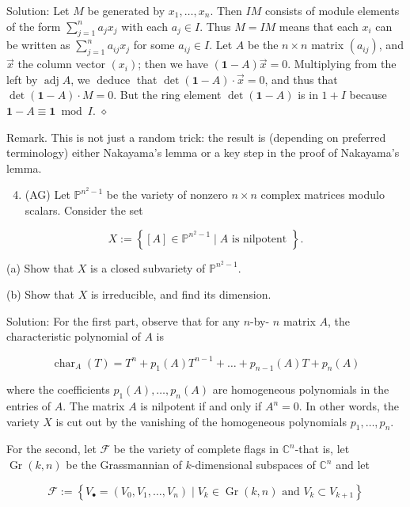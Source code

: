 \documentclass[10pt]{article}
\begin{document}
Solution: Let $M$ be generated by $x_{1}, \ldots, x_{n}$. Then $I M$ consists of module elements of the form $\sum_{j=1}^{n} a_{j} x_{j}$ with each $a_{j} \in I$. Thus $M=I M$ means that each $x_{i}$ can be written as $\sum_{j=1}^{n} a_{i j} x_{j}$ for some $a_{i j} \in I$. Let $A$ be the $n \times n$ matrix $\left(a_{i j}\right)$, and $\vec{x}$ the column vector $\left(x_{i}\right)$; then we have $(\mathbf{1}-A) \vec{x}=0$. Multiplying from the left by $\operatorname{adj} A$, we $\operatorname{deduce}$ that $\operatorname{det}(\mathbf{1}-A) \cdot \vec{x}=0$, and
thus that $\operatorname{det}(\mathbf{1}-A) \cdot M=0$. But the ring element $\operatorname{det}(\mathbf{1}-A)$ is in $1+I$ because $\mathbf{1}-A \equiv \mathbf{1} \bmod I$. $\diamond$

Remark. This is not just a random trick: the result is (depending on preferred terminology) either Nakayama's lemma or a key step in the proof of Nakayama's lemma.

\begin{enumerate}
  \setcounter{enumi}{3}
  \item (AG) Let $\mathbb{P}^{n^{2}-1}$ be the variety of nonzero $n \times n$ complex matrices modulo scalars. Consider the set
\end{enumerate}

$$
X:=\left\{[A] \in \mathbb{P}^{n^{2}-1} \mid A \text { is nilpotent }\right\} .
$$

(a) Show that $X$ is a closed subvariety of $\mathbb{P}^{n^{2}-1}$.

(b) Show that $X$ is irreducible, and find its dimension.

Solution: For the first part, observe that for any $n$-by- $n$ matrix $A$, the characteristic polynomial of $A$ is

$$
\operatorname{char}_{A}(T)=T^{n}+p_{1}(A) T^{n-1}+\ldots+p_{n-1}(A) T+p_{n}(A)
$$

where the coefficients $p_{1}(A), \ldots, p_{n}(A)$ are homogeneous polynomials in the entries of $A$. The matrix $A$ is nilpotent if and only if $A^{n}=0$. In other words, the variety $X$ is cut out by the vanishing of the homogeneous polynomials $p_{1}, \ldots, p_{n}$.

For the second, let $\mathcal{F}$ be the variety of complete flags in $\mathbb{C}^{n}$-that is, let $\operatorname{Gr}(k, n)$ be the Grassmannian of $k$-dimensional subspaces of $\mathbb{C}^{n}$ and let

$$
\mathcal{F}:=\left\{V_{\bullet}=\left(V_{0}, V_{1}, \ldots, V_{n}\right) \mid V_{k} \in \operatorname{Gr}(k, n) \text { and } V_{k} \subset V_{k+1}\right\}
$$
\end{document}
